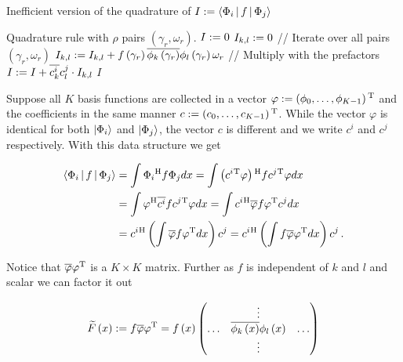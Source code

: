 \begin{algorithm}
\caption{Inefficient version of the quadrature of $I := \Braket{\Phi_i|f|\Phi_j}$}
\label{al:naive_quadrature_phi}
\begin{algorithmic}
  \REQUIRE Quadrature rule with $\rho$ pairs $\left(\gamma_r, \omega_r\right)$.
  \STATE $I := 0$
      \STATE $I_{k,l} := 0$
      \STATE // Iterate over all pairs $\left(\gamma_r, \omega_r\right)$
        \STATE $I_{k,l} := I_{k,l} + f\left( \gamma_r \right) \overline{\phi_k\left( \gamma_r \right)} \phi_l\left( \gamma_r \right) \omega_r$
      \ENDFOR
      \STATE // Multiply with the prefactors
      \STATE $I := I + \overline{c_k^i} c_l^j \cdot I_{k,l}$
    \ENDFOR
  \ENDFOR
  \RETURN $I$
\end{algorithmic}
\end{algorithm}

Suppose all $K$ basis functions are collected in a vector $\varphi := \left( \phi_0, \ldots, \phi_{K-1} \right) {}^{\textnormal{T}}$ and
the coefficients in the same manner $c := \left( c_0, \ldots, c_{K-1} \right) {}^{\textnormal{T}}$.
While the vector $\varphi$ is identical for both $\Ket{\Phi_i}$ and $\Ket{\Phi_j}$,
the vector $c$ is different and we write $c^i$ and $c^j$ respectively.
With this data structure we get

\begin{equation}
\begin{split} \label{eq:quadrature_f_matrixvalued_derivation}
  \Braket{ \Phi_i | f | \Phi_j } & = \int \Phi_i{}^{\textnormal{H}} f \Phi_j dx
                                  = \int \left( c^i{}^{\textnormal{T}} \varphi \right){}^{\textnormal{H}} f c^j{}^{\textnormal{T}} \varphi dx \\
                                 & = \int \varphi{}^{\textnormal{H}} \overline{c^i} f c^j{}^{\textnormal{T}} \varphi dx
                                  = \int c^i{}^{\textnormal{H}} \overline{\varphi} f \varphi{}^{\textnormal{T}} c^j dx \\
                                 & = c^i{}^{\textnormal{H}} \left( \int \overline{\varphi} f \varphi{}^{\textnormal{T}} dx \right) c^j
                                  = c^i{}^{\textnormal{H}} \left( \int f \overline{\varphi} \varphi{}^{\textnormal{T}} dx \right) c^j \,.
\end{split}
\end{equation}

Notice that $\overline{\varphi} \varphi{}^{\textnormal{T}}$ is a $K \times K$ matrix. Further as $f$
is independent of $k$ and $l$ and scalar we can factor it out

\begin{equation} \label{eq:matrix_f_single}
  \widetilde{F}\left( x \right) := f \overline{\varphi} \varphi{}^{\textnormal{T}} \\
                       = f\left( x \right) \begin{pmatrix}
                                          {}     & \vdots                                   & {} \\
                                          \hdots & \overline{\phi_k\left( x \right)} \phi_l\left( x \right) & \hdots \\
                                          {}     & \vdots                                       & {} \\
                                        \end{pmatrix}
\end{equation}

